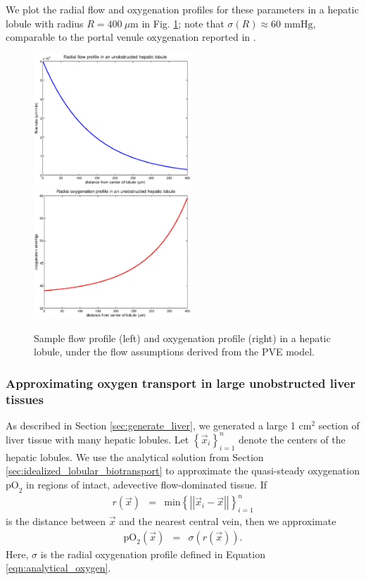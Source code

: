 \documentclass[smallextended,natbib,draft]{svjour3}
\newcommand{\beqa}{\begin{eqnarray}}
\newcommand{\eeqa}{\end{eqnarray}}
\newcommand{\micron}{\mu\textrm{m}}
\newcommand{\norm}[1]{\left|\left|#1\right|\right|}
\newcommand{\oxy}{\mathrm{pO}_2}
\newcommand{\braces}[1]{\left\{#1\right\}}
\begin{document}
We plot 
the radial flow and oxygenation profiles for these parameters in a hepatic lobule with 
radius $R = 400 \:\micron$ 
in Fig. \ref{fig:radial_flow_oxygenation}; note that $\sigma(R) \approx 60 \textrm{ mmHg}$, comparable to 
the portal venule oxygenation reported in \citet{tsukada}. 

\begin{figure}
\includegraphics[width=5.9cm]{./figures/flow.eps}
\includegraphics[width=5.9cm]{./figures/O2.eps}
\caption{Sample flow profile (left) and oxygenation profile (right) in a hepatic lobule, 
under the flow assumptions derived from the PVE model.}
\label{fig:radial_flow_oxygenation}
\end{figure}

\subsubsection{Approximating oxygen transport in large unobstructed liver tissues}
\label{sec:biotransport_unobstructed_tissue_approximation}
As described in Section \ref{sec:generate_liver}, we generated a large 1 cm$^2$ 
section of liver tissue with many hepatic lobules. Let 
$\braces{ \vec{x}_i }_{i=1}^n$ denote the centers of the hepatic lobules. 
We use the analytical solution from Section \ref{sec:idealized_lobular_biotransport} to approximate the 
quasi-steady oxygenation $\oxy$ in regions of intact, 
adevective flow-dominated tissue. If 
\beqa
r(\vec{x}) & = & \mathrm{min}\braces{ \norm{ \vec{x}_i -\vec{x}} }_{i=1}^n 
\eeqa
is the distance between $\vec{x}$ and the nearest central vein, 
then we approximate 
\beqa
\oxy(\vec{x}) & = & \sigma\left( r(\vec{x}) \right). 
\eeqa
Here, $\sigma$ is the radial oxygenation profile 
defined in Equation \ref{eqn:analytical_oxygen}. 
\end{document}
